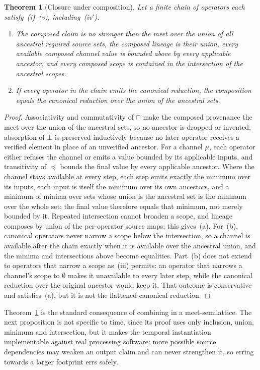 \documentclass[preprint,3p,11pt,authoryear]{elsarticle}
\newtheorem{theorem}{Theorem}
\begin{document}
\begin{theorem}[Closure under composition]
\label{thm:composition}
Let a finite chain of operators each satisfy~(i)--(v), including~(iv$'$).
\begin{enumerate}
\item[(a)] The composed claim is no stronger than the meet over the union of all
  ancestral required source sets, the composed lineage is their union, every
  available composed channel value is bounded above by every applicable
  ancestor, and every composed scope is contained in the intersection of the
  ancestral scopes.
\item[(b)] If every operator in the chain emits the canonical reduction, the
  composition equals the canonical reduction over the union of the ancestral
  sets.
\end{enumerate}
\end{theorem}
\begin{proof}
Associativity and commutativity of $\sqcap$ make the composed provenance the
meet over the union of the ancestral sets, so no ancestor is dropped or
invented; absorption of $\bot$ is preserved inductively because no later
operator receives a verified element in place of an unverified ancestor. For a
channel $\mu$, each operator either refuses the channel or emits a value bounded
by its applicable inputs, and transitivity of $\preceq$ bounds the final value by
every applicable ancestor. Where the channel stays available at every step, each
step emits exactly the minimum over its inputs, each input is itself the minimum
over its own ancestors, and a minimum of minima over sets whose union is the ancestral
set is the minimum over the whole set; the final value therefore equals that
minimum, not merely bounded by it. Repeated intersection cannot broaden a scope, and
lineage composes by union of the per-operator source maps; this gives~(a). For~(b),
canonical operators never narrow a scope below the intersection, so a channel
is available after the chain exactly when it is available over the ancestral
union, and the minima and intersections above become equalities. Part~(b) does
not extend to operators that narrow a scope as~(iii) permits: an operator that
narrows a channel's scope to $\emptyset$ makes it unavailable to every later
step, while the canonical reduction over the original ancestor would keep it.
That outcome is conservative and satisfies~(a), but it is not the flattened
canonical reduction.
\end{proof}

Theorem~\ref{thm:composition} is the standard consequence of combining in a
meet-semilattice. The next proposition is not specific to time, since its proof
uses only inclusion, union, minimum and intersection, but it makes the
temporal instantiation implementable against real processing software: more
possible source dependencies may weaken an output claim and can never
strengthen it, so erring towards a larger footprint errs safely.
\end{document}
